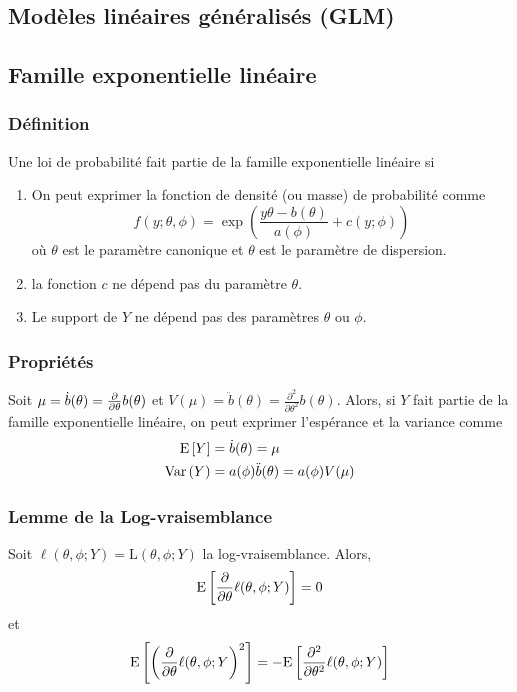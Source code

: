 \documentclass[10pt, french]{article}
\begin{document}
\begin{multicols*}{3}
\section{Modèles linéaires généralisés (GLM)}
\subsection*{Famille exponentielle linéaire}
\subsubsection*{Définition}
Une loi de probabilité fait partie de la famille exponentielle linéaire si
\begin{enumerate}[label=\faAngleRight]
\item On peut exprimer la fonction de densité (ou masse) de probabilité comme
\[f(y ; \theta, \phi) =   \exp \left( \frac{y \theta - b(\theta)}{a(\phi)} + c(y ; \phi)    \right)  \] 
où $\theta$ est le paramètre canonique et $\theta$ est le paramètre de dispersion.

\item la fonction $c$ ne dépend pas du paramètre $\theta$.
\item Le support de $Y$ ne dépend pas des paramètres $\theta$ ou $\phi$.
\end{enumerate}

\subsubsection*{Propriétés}
Soit $\mu = \dot{b}(\theta) = \frac{\partial}{\partial \theta} b(\theta)$ et $V(\mu) = \ddot{b}(\theta) = \frac{\partial^2}{\partial \theta^2} b(\theta)$. Alors, si $Y$ fait partie de la famille exponentielle linéaire, on peut exprimer l'espérance et la variance comme
\begin{align*}
\mathrm{E} \left[ Y \right]	& = \dot{b}(\theta) = \mu \\
\mathrm{Var} \left( Y \right)	& = a(\phi) \ddot{b}(\theta) = a(\phi) V(\mu) \\
\end{align*}

\subsubsection*{Lemme de la Log-vraisemblance}
Soit $\ell(\theta, \phi ; Y) = \mathrm{L}(\theta, \phi ; Y)$ la log-vraisemblance. Alors,
\[\mathrm{E} \left[ \frac{\partial}{\partial \theta} \ell(\theta, \phi ; Y) \right] = 0\]
et
\[\mathrm{E} \left[ \left( \frac{\partial}{\partial \theta}  \ell(\theta, \phi ; Y \right)^2 \right] = - \mathrm{E} \left[ \frac{\partial^2}{\partial \theta^2} \ell(\theta, \phi ; Y) \right]\]


\end{multicols*}
\end{document}
